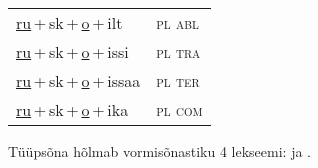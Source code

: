 \begin{minipage}{\textwidth}
\begin{sideways}
\begin{tabular}{l l}
\underline{ru}\,+\,sk\,+\,\underline{o}\,+\,ilt & \textsc{ pl abl } \\
\underline{ru}\,+\,sk\,+\,\underline{o}\,+\,issi & \textsc{ pl tra } \\
\underline{ru}\,+\,sk\,+\,\underline{o}\,+\,issaa & \textsc{ pl ter } \\
\underline{ru}\,+\,sk\,+\,\underline{o}\,+\,ika & \textsc{ pl com } \\
\end{tabular}
\end{sideways}
\label{tab:tüüpsõnamall-rusko}

\end{minipage}

 
\vspace{1em}
\noindent Tüüpsõna hõlmab vormisõnastiku 4 lekseemi:  ja .
